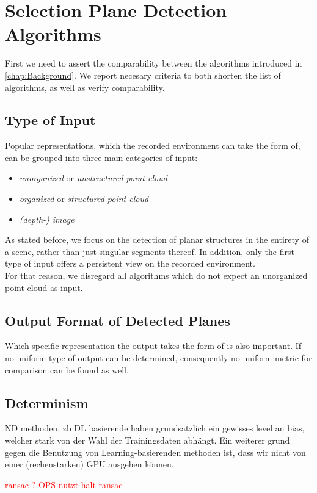 \documentclass[main.tex]{subfiles}
\begin{document}
\section{Selection Plane Detection Algorithms}
First we need to assert the comparability between the algorithms introduced in \ref{chap:Background}.
We report necesary criteria to both shorten the list of algorithms, as well as verify comparability.

\subsection*{Type of Input}
Popular representations, which the recorded environment can take the form of, can be grouped into three main categories of input:
\begin{itemize}
    \item \textit{unorganized} or \textit{unstructured point cloud}
    \item \textit{organized} or \textit{structured point cloud}
    \item \textit{(depth-) image}
\end{itemize}

As stated before, we focus on the detection of planar structures in the entirety of a scene, rather than just singular segments thereof.
In addition, only the first type of input offers a persistent view on the recorded environment.\\
For that reason, we disregard all algorithms which do not expect an unorganized point cloud as input.


\subsection*{Output Format of Detected Planes}
Which specific representation the output takes the form of is also important.
If no uniform type of output can be determined, consequently no uniform metric for comparison can be found as well.

\subsection*{Determinism}
ND methoden, zb DL basierende haben grundsätzlich ein gewisses level an bias, welcher stark von der Wahl der Trainingsdaten abhängt.
Ein weiterer grund gegen die Benutzung von Learning-basierenden methoden ist, dass wir nicht von einer (rechenstarken) GPU ausgehen können.

\textcolor{red}{ransac ? OPS nutzt halt ransac}
\end{document}
